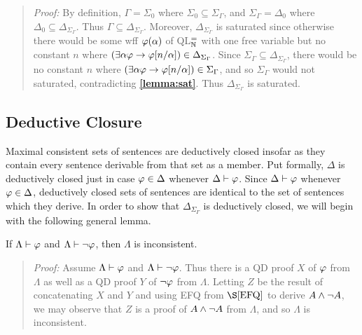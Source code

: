 \begin{quote} 
  \textit{Proof:} 
  By definition, $\Gamma=\Sigma_0$ where $\Sigma_0\subseteq\Sigma_\Gamma$, and $\Sigma_\Gamma=\Delta_0$ where $\Delta_0\subseteq\Delta_{\Sigma_\Gamma}$.
  Thus $\Gamma\subseteq\Delta_{\Sigma_\Gamma}$.
  Moreover, $\Delta_{\Sigma_\Gamma}$ is saturated since otherwise there would be some wff $\varphi(\alpha)$ of QL$^=_{\mathbb{N}}$ with one free variable but no constant $n$ where $(\exists \alpha\varphi \rightarrow \varphi[n/\alpha])\in\Delta_{\Sigma_\Gamma}$. 
  Since $\Sigma_\Gamma\subseteq\Delta_{\Sigma_\Gamma}$, there would be no constant $n$ where $(\exists \alpha\varphi \rightarrow \varphi[n/\alpha])\in\Sigma_\Gamma$, and so $\Sigma_\Gamma$ would not saturated, contradicting \textbf{\ref{lemma:sat}}.
  Thus $\Delta_{\Sigma_\Gamma}$ is saturated. 

\end{quote}



\subsection{Deductive Closure}%
  \label{sub:DeductiveClosure}

Maximal consistent sets of sentences are deductively closed insofar as they contain every sentence derivable from that set as a member.
Put formally, $\Delta$ is deductively closed just in case $\varphi\in\Delta$ whenever $\Delta\vdash\varphi$.
Since $\Delta\vdash\varphi$ whenever $\varphi\in\Delta$, deductively closed sets of sentences are identical to the set of sentences which they derive.
In order to show that $\Delta_{\Sigma_\Gamma}$ is deductively closed, we will begin with the following general lemma. 

\begin{Lthm} \label{lemma:cont}
  If $\Lambda\vdash\varphi$ and $\Lambda\vdash\neg\varphi$, then $\Lambda$ is inconsistent. 
\end{Lthm}

\begin{quote} 
  \textit{Proof:} 
  Assume $\Lambda\vdash\varphi$ and $\Lambda\vdash\neg\varphi$.
  Thus there is a QD proof $X$ of $\varphi$ from $\Lambda$ as well as a QD proof $Y$ of $\neg\varphi$ from $\Lambda$. 
  Letting $Z$ be the result of concatenating $X$ and $Y$ and using EFQ from $\S\ref{EFQ}$ to derive $A\wedge\neg A$, we may observe that $Z$ is a proof of $A\wedge\neg A$ from $\Lambda$, and so $\Lambda$ is inconsistent.
\end{quote}
  




